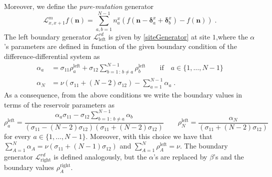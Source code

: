 \documentclass[10pt]{article}
\numberwithin{equation}{section}
\numberwithin{equation}{subsection}
\newcommand{\dt}{\;.}
\begin{document}
{Moreover, we define the \textit{pure-mutation} generator
\begin{equation}
	\mathcal{L}_{x,x+1}^{m}f(\bm{n})=\sum_{a,b=1}^{N-1}n_{a}^{x}\left(f(\bm{n}-\bm{\delta}_{a}^{x}+\bm{\delta}_{b}^{x})-f(\bm{n})\right)\dt
\end{equation}
The left boundary generator $\mathcal{L}_{\text{left}}^{rd}$ is given by \eqref{siteGenerator} at site $1$,where the $\alpha$'s parameters are defined in function of the given boundary condition of the difference-differential system as
\begin{align}\label{boundaryParamRD}
		\alpha_{a}&=\sigma_{11}\rho_{a}^{\text{left}}+\sigma_{12}\sum_{b=1\,:\,b\neq a}^{N-1}\rho_{b}^{\text{left}}\qquad \text{if} \quad a\in \{1,\ldots,N-1\}\nonumber\\
		\alpha_{N}&=\nu\left(\sigma_{11}+(N-2)\sigma_{12}\right)-\sum_{a=1}^{N-1}\alpha_{a}\dt
\end{align}
As a consequence, from the above conditions we write the boundary values in terms of the reservoir parameters as
\begin{equation}
	\rho_{a}^{\text{left}}=\frac{\alpha_{a}\sigma_{11}-\sigma_{12}\sum_{b=1\,:\,b\neq a}^{N-1}\alpha_{b}}{(\sigma_{11}-(N-2)\sigma_{12})(\sigma_{11}+(N-2)\sigma_{12})}\qquad \rho_{N}^{\text{left}}=\frac{\alpha_{N}}{(\sigma_{11}+(N-2)\sigma_{12})}
\end{equation}
for every $a\in\{1,\ldots,N-1\}$. Moreover, with this choice we have that $\sum_{A=1}^{N}\alpha_{A}=\nu(\sigma_{11}+(N-1)\sigma_{12})$ and $\sum_{A=1}^{N}\rho_{A}^{\text{left}}=\nu$. 
The boundary generator $\mathcal{L}_{\text{right}}^{rd}$ is defined analogously, but the $\alpha$'s are replaced by $\beta$'s and the boundary values $\rho_{A}^{\text{right}}$.
}
\end{document}
